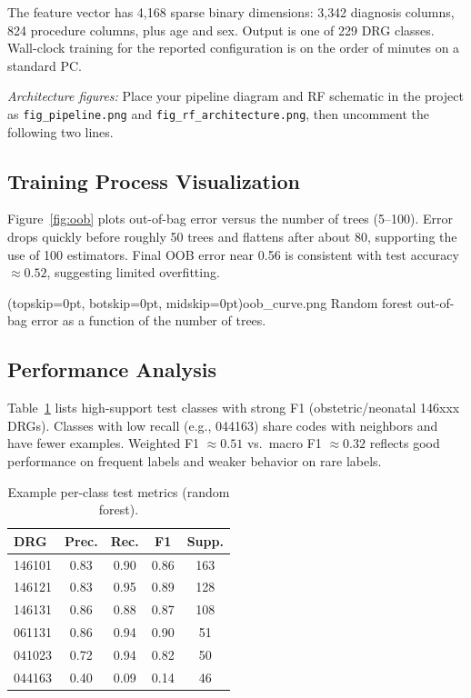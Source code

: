 \documentclass{ieeeaccess}
\begin{document}
The feature vector has 4{,}168 sparse binary dimensions: 3{,}342 diagnosis columns, 824 procedure columns, plus age and sex. Output is one of 229 DRG classes. Wall-clock training for the reported configuration is on the order of minutes on a standard PC.

\textit{Architecture figures:} Place your pipeline diagram and RF schematic in the project as \texttt{fig\_pipeline.png} and \texttt{fig\_rf\_architecture.png}, then uncomment the following two lines.


\subsection{Training Process Visualization}
Figure~\ref{fig:oob} plots out-of-bag error versus the number of trees (5--100). Error drops quickly before roughly 50 trees and flattens after about 80, supporting the use of 100 estimators. Final OOB error near 0.56 is consistent with test accuracy $\approx 0.52$, suggesting limited overfitting.

\Figure[t!](topskip=0pt, botskip=0pt, midskip=0pt){oob_curve.png}
{Random forest out-of-bag error as a function of the number of trees.\label{fig:oob}}

\subsection{Performance Analysis}
Table~\ref{tab:topdrg} lists high-support test classes with strong F1 (obstetric/neonatal 146xxx DRGs). Classes with low recall (e.g., 044163) share codes with neighbors and have fewer examples. Weighted F1 $\approx 0.51$ vs.\ macro F1 $\approx 0.32$ reflects good performance on frequent labels and weaker behavior on rare labels.

\begin{table}[!t]
\caption{Example per-class test metrics (random forest).}
\label{tab:topdrg}
\centering
{\footnotesize
\begin{tabular}{lcccc}
\hline
\textbf{DRG} & \textbf{Prec.} & \textbf{Rec.} & \textbf{F1} & \textbf{Supp.} \\
\hline
146101 & 0.83 & 0.90 & 0.86 & 163 \\
146121 & 0.83 & 0.95 & 0.89 & 128 \\
146131 & 0.86 & 0.88 & 0.87 & 108 \\
061131 & 0.86 & 0.94 & 0.90 & 51 \\
041023 & 0.72 & 0.94 & 0.82 & 50 \\
044163 & 0.40 & 0.09 & 0.14 & 46 \\
\hline
\end{tabular}}
\end{table}
\end{document}
